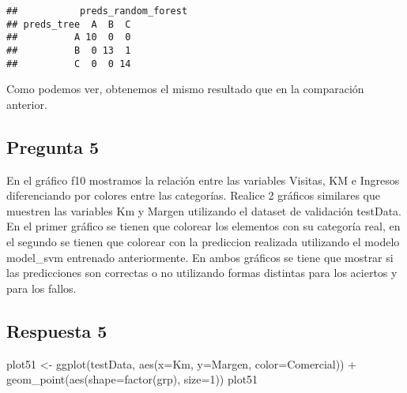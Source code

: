 \documentclass[]{article}
\newenvironment{Shaded}{\begin{snugshade}}{\end{snugshade}}
\newcommand{\KeywordTok}[1]{\textcolor[rgb]{0.94,0.87,0.69}{#1}}
\newcommand{\DataTypeTok}[1]{\textcolor[rgb]{0.87,0.87,0.75}{#1}}
\newcommand{\DecValTok}[1]{\textcolor[rgb]{0.86,0.86,0.80}{#1}}
\newcommand{\StringTok}[1]{\textcolor[rgb]{0.80,0.58,0.58}{#1}}
\newcommand{\OperatorTok}[1]{\textcolor[rgb]{0.94,0.94,0.82}{#1}}
\newcommand{\NormalTok}[1]{\textcolor[rgb]{0.80,0.80,0.80}{#1}}
\begin{document}
\begin{verbatim}
##           preds_random_forest
## preds_tree  A  B  C
##          A 10  0  0
##          B  0 13  1
##          C  0  0 14
\end{verbatim}

Como podemos ver, obtenemos el mismo resultado que en la comparación
anterior.

\subsection{Pregunta 5}\label{pregunta-5}

En el gráfico f10 mostramos la relación entre las variables Visitas, KM
e Ingresos diferenciando por colores entre las categorías. Realice 2
gráficos similares que muestren las variables Km y Margen utilizando el
dataset de validación testData. En el primer gráfico se tienen que
colorear los elementos con su categoría real, en el segundo se tienen
que colorear con la prediccion realizada utilizando el modelo model\_svm
entrenado anteriormente. En ambos gráficos se tiene que mostrar si las
predicciones son correctas o no utilizando formas distintas para los
aciertos y para los fallos.

\subsection{Respuesta 5}\label{respuesta-5}

\begin{Shaded}
\end{Shaded}

\begin{Shaded}
\begin{Highlighting}[]
\NormalTok{plot51 <-}\StringTok{ }\KeywordTok{ggplot}\NormalTok{(testData, }\KeywordTok{aes}\NormalTok{(}\DataTypeTok{x=}\NormalTok{Km, }\DataTypeTok{y=}\NormalTok{Margen, }\DataTypeTok{color=}\NormalTok{Comercial)) }\OperatorTok{+}\StringTok{ }\KeywordTok{geom_point}\NormalTok{(}\KeywordTok{aes}\NormalTok{(}\DataTypeTok{shape=}\KeywordTok{factor}\NormalTok{(grp), }\DataTypeTok{size=}\DecValTok{1}\NormalTok{))}
\NormalTok{plot51}
\end{Highlighting}
\end{Shaded}
\end{document}
